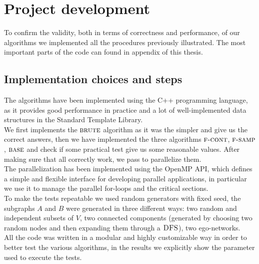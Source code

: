 
\chapter{Project development}
    
    To confirm the validity, both in terms of correctness and performance, of our algorithms we implemented all the procedures previously illustrated. 
    The most important parts of the code can found in appendix of this thesis.
    
    \section{Implementation choices and steps}
    
    The algorithms have been implemented using the C++ programming language, 
    as it provides good performance in practice and a lot of well-implemented data structures in the Standard Template Library.\\
    
    We first implements the $\textsc{brute}$ algorithm as it was the simpler and give us the correct answers, then we have implemented the three algorithms $\textsc{f-cont}$, $\textsc{f-samp}$, $\textsc{base}$ and check if some practical test give us some reasonable values.
    After making sure that all correctly work, we pass to parallelize them.\\
    
    The parallelization has been implemented using the OpenMP API\cite{openmp}, which defines a simple and flexible interface for developing parallel applications, in particular we use it to manage the parallel for-loops and the critical sections.\\
    
    To make the tests repeatable we used random generators with fixed seed, the subgraphs $A$ and $B$ were generated in three different ways: two random and independent subsets of $V$, two connected components (generated by choosing two random nodes and then expanding them through a $\textsc{DFS}$), two ego-networks.\\
    
    All the code was written in a modular and highly customizable way in order
    to better test the various algorithms, in the results we explicitly show the parameter used to execute the tests.
    
    \clearpage
    
